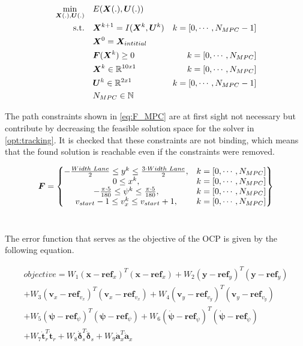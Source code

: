 \begin{equation}\label{opt:tracking}
\begin{aligned}
\min_{\bm{X}(.),\bm{U}(.)} \quad &  E(\bm{X}(.),\bm{U}(.)) \\
\textrm{s.t.} \quad & \bm{X}^{k+1} = I(\bm{X}^{k}, \bm{U}^{k}) & k = [0,\cdots, N_{MPC}-1]\\
& \bm{X}^{0} = \bm{X}_{intitial} \\
& \bm{F}(\bm{X}^{k}) \geq 0	& k = [0,\cdots, N_{MPC}]\\
& \bm{X}^{k}\in \mathbb{R}^{10x1}  & k = [0,\cdots, N_{MPC}]\\
& \bm{U}^{k}\in \mathbb{R}^{2x1} \hspace{3 mm} & k = [0,\cdots, N_{MPC}-1]\\
&  N_{MPC} \in \mathbb{N}
\end{aligned}
\end{equation}

The path constraints shown in \ref{eq:F_MPC} are at first sight not necessary but contribute by decreasing the feasible solution space for the solver in \ref{opt:tracking}. It is checked that these constraints are not binding, which means that the found solution is reachable even if the constraints were removed. 

\begin{equation}\label{eq:F_MPC}
\bm{F} =
\begin{Bmatrix}
-\frac{Width\hspace{1mm}Lane}{2} \leq y^k \leq \frac{3\cdot Width\hspace{1mm}Lane}{2}, & k = [0,\cdots, N_{MPC}] \\
0 \leq x^k, & k = [0,\cdots, N_{MPC}] \\
-\frac{\pi\cdot 5}{180} \leq \psi^k \leq \frac{\pi\cdot 5}{180}, & k = [0,\cdots, N_{MPC}] \\
v_{start}-1 \leq v_x^k \leq v_{start}+1, & k = [0,\cdots, N_{MPC}]
\end{Bmatrix}
\end{equation}\

The error function that serves as the objective of the OCP is given by the following equation.


\begin{multline*} 
objective=W_1(\bm{x}-\bm{ref}_x)^T(\bm{x}-\bm{ref}_x)+W_2(\bm{y}-\bm{ref}_y)^T(\bm{y}-\bm{ref}_y)\\
+W_3(\bm{v}_x-\bm{ref}_{v_x})^T(\bm{v}_x-\bm{ref}_{v_x})+W_4(\bm{v}_y-\bm{ref}_{v_y})^T(\bm{v}_y-\bm{ref}_{v_y})\\+W_5(\bm{\psi}-\bm{ref}_{\psi})^T(\bm{\psi}-\bm{ref}_\psi)
+W_6(\bm{\dot{\psi}}-\bm{ref}_{\dot{\psi}})^T(\bm{\dot{\psi}}-\bm{ref}_{\dot{\psi}})\\ + W_7\dot{\bm{t}}_r^T\dot{\bm{t}}_r+W_8\dot{\bm{\delta}}_s^T\dot{\bm{\delta}}_s + W_9\dot{\bm{a}}_x^T\dot{\bm{a}}_x
\end{multline*}













